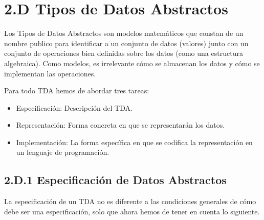 \section*{2.D Tipos de Datos Abstractos}
 



Los Tipos de Datos Abstractos son modelos matemáticos que constan de un nombre publico para identificar a un conjunto de datos (valores) junto con un conjunto de operaciones bien definidas sobre los datos (como una estructura algebraica). Como modelos, es irrelevante cómo se almacenan los datos y cómo se implementan las operaciones.

Para todo TDA hemos de abordar tres tareas:
\begin{itemize}
\item Especificación: Descripción del TDA.
\item Representación: Forma concreta en que se representarán los datos.
\item Implementación: La forma específica en que se codifica la representación en un lenguaje de programación.
\end{itemize}



\subsection*{2.D.1 Especificación de Datos Abstractos}


La especificación de un TDA no es diferente a las condiciones generales de cómo debe ser una especificación, solo que ahora hemos de tener en cuenta lo siguiente.


